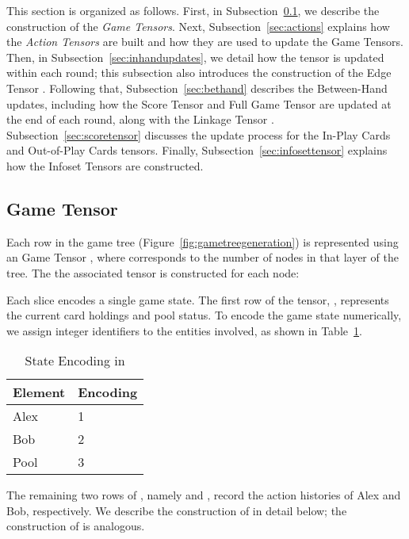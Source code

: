 This section is organized as follows. First, in Subsection~\ref{sec:gametensor}, we describe the construction of the \emph{Game Tensors}. Next, Subsection~\ref{sec:actions} explains how the \emph{Action Tensors} are built and how they are used to update the Game Tensors. Then, in Subsection~\ref{sec:inhandupdates}, we detail how the  tensor is updated within each round; this subsection also introduces the construction of the Edge Tensor . Following that, Subsection~\ref{sec:bethand} describes the Between-Hand updates, including how the Score Tensor and Full Game Tensor are updated at the end of each round, along with the Linkage Tensor . Subsection~\ref{sec:scoretensor} discusses the update process for the In-Play Cards and Out-of-Play Cards tensors. Finally, Subsection~\ref{sec:infosettensor} explains how the Infoset Tensors are constructed.

\subsection{Game Tensor}\label{sec:gametensor}
Each row in the game tree (Figure~\ref{fig:gametreegeneration}) is represented using an  Game Tensor , where  corresponds to the number of nodes in that layer of the tree. The the associated  tensor is constructed for each node:

Each slice  encodes a single game state. The first row of the tensor, , represents the current card holdings and pool status. To encode the game state numerically, we assign integer identifiers to the entities involved, as shown in Table~\ref{tab:state_encoding}.

\begin{table}[h!]
\centering
\caption{State Encoding in }
\label{tab:state_encoding}
\begin{tabular}{ll}
\toprule
\textbf{Element} & \textbf{Encoding} \\
\midrule
Alex                 & 1 \\
Bob                  & 2 \\
Pool                 & 3 \\
\bottomrule
\end{tabular}
\end{table}

The remaining two rows of , namely  and , record the action histories of Alex and Bob, respectively. We describe the construction of  in detail below; the construction of  is analogous.


